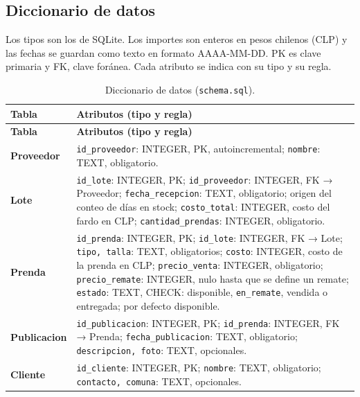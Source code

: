 \documentclass[11pt,letterpaper]{article}
\begin{document}
\subsection{Diccionario de datos}

Los tipos son los de SQLite. Los importes son enteros en pesos chilenos (CLP) y las fechas se guardan como texto en formato AAAA-MM-DD. PK es clave primaria y FK, clave foránea. Cada atributo se indica con su tipo y su regla.
{\scriptsize
\setlength{\tabcolsep}{3pt}\renewcommand{\arraystretch}{1.15}
\begin{longtable}{>{\raggedright\arraybackslash}p{}>{\raggedright\arraybackslash}p{}}
\caption{Diccionario de datos (\texttt{schema.sql}).}\\
\hline
\rowcolor[HTML]{D9EAF7}\textbf{\textbf{Tabla}} & \textbf{\textbf{Atributos (tipo y regla)}} \\
\hline
\endfirsthead
\hline
\rowcolor[HTML]{D9EAF7}\textbf{\textbf{Tabla}} & \textbf{\textbf{Atributos (tipo y regla)}} \\
\hline
\endhead
\textbf{Proveedor} & \texttt{id\_\allowbreak{}proveedor}: INTEGER, PK, autoincremental; \texttt{nombre}: TEXT, obligatorio. \\
\hline
\textbf{Lote} & \texttt{id\_\allowbreak{}lote}: INTEGER, PK; \texttt{id\_\allowbreak{}proveedor}: INTEGER, FK → Proveedor; \texttt{fecha\_\allowbreak{}recepcion}: TEXT, obligatorio; origen del conteo de días en stock; \texttt{costo\_\allowbreak{}total}: INTEGER, costo del fardo en CLP; \texttt{cantidad\_\allowbreak{}prendas}: INTEGER, obligatorio. \\
\hline
\textbf{Prenda} & \texttt{id\_\allowbreak{}prenda}: INTEGER, PK; \texttt{id\_\allowbreak{}lote}: INTEGER, FK → Lote; \texttt{tipo, talla}: TEXT, obligatorios; \texttt{costo}: INTEGER, costo de la prenda en CLP; \texttt{precio\_\allowbreak{}venta}: INTEGER, obligatorio; \texttt{precio\_\allowbreak{}remate}: INTEGER, nulo hasta que se define un remate; \texttt{estado}: TEXT, CHECK: disponible, \texttt{en\_\allowbreak{}remate}, vendida o entregada; por defecto disponible. \\
\hline
\textbf{Publicacion} & \texttt{id\_\allowbreak{}publicacion}: INTEGER, PK; \texttt{id\_\allowbreak{}prenda}: INTEGER, FK → Prenda; \texttt{fecha\_\allowbreak{}publicacion}: TEXT, obligatorio; \texttt{descripcion, foto}: TEXT, opcionales. \\
\hline
\textbf{Cliente} & \texttt{id\_\allowbreak{}cliente}: INTEGER, PK; \texttt{nombre}: TEXT, obligatorio; \texttt{contacto, comuna}: TEXT, opcionales. \\

\end{longtable}}
\end{document}
